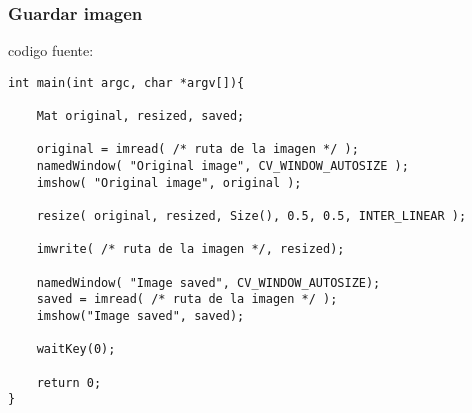 \begin{frame}[fragile]
   \frametitle{Guardar imagen}

    codigo fuente:

    \scriptsize

    \begin{lstlisting}
int main(int argc, char *argv[]){

    Mat original, resized, saved;

    original = imread( /* ruta de la imagen */ );
    namedWindow( "Original image", CV_WINDOW_AUTOSIZE );
    imshow( "Original image", original );

    resize( original, resized, Size(), 0.5, 0.5, INTER_LINEAR );

    imwrite( /* ruta de la imagen */, resized);

    namedWindow( "Image saved", CV_WINDOW_AUTOSIZE);
    saved = imread( /* ruta de la imagen */ );
    imshow("Image saved", saved);

    waitKey(0);

    return 0;
}
    \end{lstlisting}

\end{frame}
